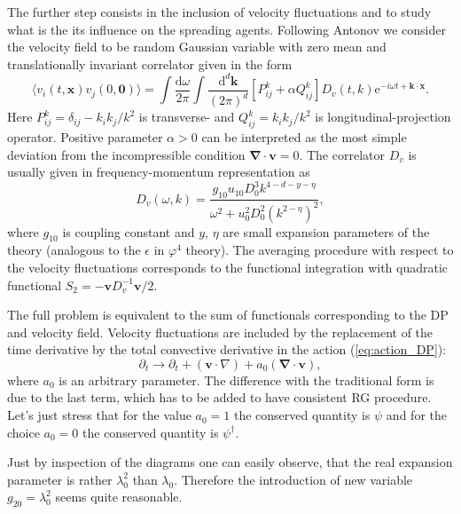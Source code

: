 The further step consists in the inclusion of velocity fluctuations and to study what is
the its influence on the spreading agents. Following Antonov \cite{Antonov_1999} we
 consider the velocity field to be random Gaussian variable with zero mean and 
 translationally invariant correlator given in the form
\begin{equation}
\langle v_i(t,{\bm x}) v_j (0,{\bm 0}) \rangle =
 \int \frac{{\mathrm d} \omega}{2\pi}
 \int \frac{{\mathrm d}^d {\bm k}}{(2\pi)^d}
 [P_{ij}^{k} + \alpha Q_{ij}^{k}]
  D_v (t,k) {\mathrm e}^{-i\omega  t  +{\bm k}\cdot {\bm x}}.
\end{equation}
 Here $P_{ij}^{k}=\delta_{ij}-k_ik_j/k^2$
is transverse- and $Q_{ij}^{k}=k_i k_j /k^2$ is longitudinal-projection operator. Positive
parameter $\alpha>0$ can be interpreted as the most simple
deviation from the incompressible condition ${\bm \nabla}\cdot {\bm v} = 0$.
 The correlator $D_v$ is usually given \cite{Antonov_1999} in
frequency-momentum representation as
\begin{equation}
D_v (\omega,k) = \frac{g_{10} u_{10} D_0^3 k^{4-d-y-\eta}}{\omega^2 + u_0^2 D_0^2 (k^{2-\eta})^2}  ,
\end{equation}
where $g_{10}$ is coupling constant and $y$, $\eta$ are small expansion parameters of the theory
(analogous to the $\epsilon$ in $\varphi^4$ theory). 
The averaging procedure with respect to the velocity fluctuations corresponds to the
functional integration with quadratic functional 
$S_{2} = - {\bm v} D^{-1}_v  {\bm v}/2$.

The full problem is equivalent to the sum of functionals corresponding
 to the DP and velocity field. Velocity fluctuations are included by
   the replacement of the time derivative by the total convective derivative in the action (\ref{eq:action_DP}):
\begin{equation}
\partial_t \rightarrow \partial_t +({\bm v}\cdot\nabla)+a_0 ({\bm \nabla}\cdot{\bm v}),
\end{equation}
where $a_0$ is an arbitrary parameter. The difference with the traditional form is due to the
last term, which has to be added to have consistent RG procedure.
 Let's just stress that for the value $a_0=1$ the conserved quantity is $\psi$ and for the choice $a_0=0$ the
  conserved quantity is  $\psi^{\dagger}$.

Just by inspection of the diagrams one can easily observe, that the real expansion parameter is 
rather $\lambda_0^2$ than $\lambda_0$. Therefore the introduction of new variable $ g_{20} = \lambda_0^2 $ seems
quite reasonable.

